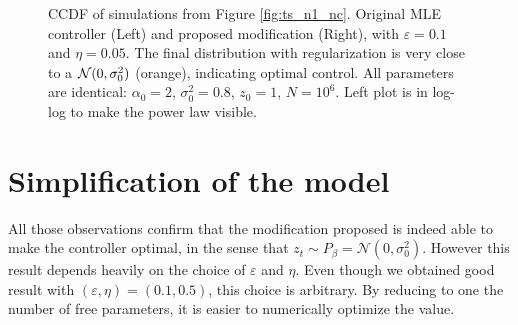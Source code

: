 \documentclass[FinalReport.tex]{subfiles}
\begin{document}
\begin{figure}[h!]%
\centering
	\centering
	\caption{CCDF of simulations from Figure \ref{fig:ts_n1_nc}. Original MLE controller (Left) and proposed modification (Right), with $\varepsilon=0.1$ and $\eta=0.05$. The final distribution with regularization is very close to a $\mathcal{N}(0,\sigma_0^2)$ (orange), indicating optimal control. 
	All parameters are identical: $\alpha_0=2$, $\sigma_0^2=0.8$, $z_0=1$, $N=10^6$. Left plot is in log-log to make the power law visible.}
	\label{fig:dist_n1_nc}	
\end{figure}

\section{Simplification of the model}
All those observations confirm that the modification proposed is indeed able to make the controller optimal, in the sense that $z_t\sim P_\beta=\mathcal{N}(0,\sigma_0^2)$. However this result depends heavily on the choice of $\varepsilon$ and $\eta$. Even though we obtained good result with $(\varepsilon,\eta)=(0.1,0.5)$, this choice is arbitrary. By reducing to one the number of free parameters, it is easier to numerically optimize the value.
\end{document}
